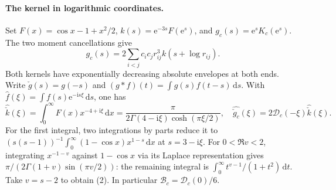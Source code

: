 \documentclass[11pt,letterpaper]{article}
\theoremstyle{definition}
\newcommand{\dd}{\,\mathrm d}
\newcommand{\ii}{\mathrm i}
\newcommand{\ee}{\mathrm e}
\newcommand{\BB}{\mathcal B}
\newcommand{\sym}{\mathcal D}
\begin{document}
\paragraph{The kernel in logarithmic coordinates.}
Set $F(x)=\cos x-1+x^2/2$,
$k(s)=\ee^{-3s}F(\ee^s)$, and $g_c(s)=\ee^s K_c(\ee^s)$.
The two moment cancellations give
\[
 g_c(s)=2\sum_{i<j}c_ic_jr_{ij}^3 k(s+\log r_{ij}).
 \tag{1}\label{eq:trans}
\]
Both kernels have exponentially decreasing absolute envelopes at both ends. Write $\check g(s)=g(-s)$ and $(g*f)(t)=\int g(s)f(t-s)\dd s$.
With $\widehat f(\xi)=\int f(s)\ee^{-\ii s\xi}\dd s$, one has
\[
 \widehat{\check k}(\xi)=\int_0^\infty F(x)x^{-4+\ii\xi}\dd x
 =\frac{\pi}{2\Gamma(4-\ii\xi)\cosh(\pi\xi/2)},\quad
 \widehat{\check g_c}(\xi)=2\sym_c(-\xi)\widehat{\check k}(\xi).
 \tag{2}\label{eq:gamma}
\]
For the first integral, two integrations by parts reduce it to
$(s(s-1))^{-1}\int_0^\infty(1-\cos x)x^{1-s}\dd x$ at $s=3-\ii\xi$.
For $0<\Re v<2$, integrating $x^{-1-v}$ against $1-\cos x$ via its Laplace representation gives $\pi/(2\Gamma(1+v)\sin(\pi v/2))$: the remaining integral is $\int_0^\infty t^{v-1}/(1+t^2)\dd t$. Take $v=s-2$ to obtain (2).
In particular $\BB_c=\sym_c(0)/6$.
\end{document}
